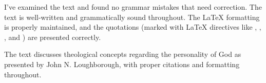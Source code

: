 I've examined the text and found no grammar mistakes that need correction. The text is well-written and grammatically sound throughout. The LaTeX formatting is properly maintained, and the quotations (marked with LaTeX directives like \othersnogap{}, \others{}, \egwinline{}, and \bible{}) are presented correctly.

The text discusses theological concepts regarding the personality of God as presented by John N. Loughborough, with proper citations and formatting throughout.
